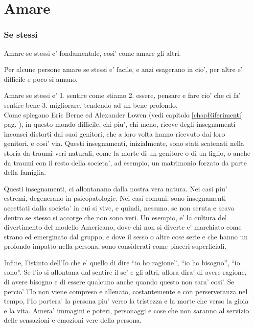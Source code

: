 \section{Amare}
\label{amareSe}


\subsubsection{Se stessi}
Amare se stessi e' fondamentale, cosi' come amare gli altri.

Per alcune persone amare se stessi e' facile, e anzi esagerano in cio', per altre e' difficile e poco si amano.

Amare se stessi e' 1. sentire come stiamo 2. essere, pensare e fare cio' che ci fa' sentire bene 3. migliorare, tendendo ad un bene profondo.\\

Come spiegano Eric Berne ed Alexander Lowen (vedi capitolo \ref{chapRiferimenti} pag. \pageref{chapRiferimenti}), in questo mondo difficile, chi piu', chi meno, riceve degli insegnamenti inconsci distorti dai suoi genitori, che a loro volta hanno ricevuto dai loro genitori, e cosi' via. Questi insegnamenti, inizialmente, sono stati scatenati nella storia da traumi veri naturali, come la morte di un genitore o di un figlio, o anche da traumi con il resto della societa', ad esempio, un matrimonio forzato da parte della famiglia.

Questi insegnamenti, ci allontanano dalla nostra vera natura. Nei casi piu' estremi, degenerano in psicopatologie. Nei casi comuni, sono insegnamenti accettati dalla societa' in cui si vive, e quindi, nessuno, se non scruta e scava dentro se stesso si accorge che non sono veri. Un esempio, e' la cultura del divertimento del modello Americano, dove chi non si diverte e' marchiato come strano ed emerginato dal gruppo, e dove il sesso o altre cose serie e che hanno un profondo impatto nella persona, sono considerati come piaceri superficiali.

Infine, l'istinto dell'Io che e' quello di dire ``io ho ragione'', ``io ho bisogno'', ``io sono''. Se l'io si allontana dal sentire il se' e gli altri, allora dira' di avere ragione, di avere bisogno e di essere qualcuno anche quando questo non sara' cosi'. Se percio' l'Io non viene compreso e allenato, costantemente e con perserveranza nel tempo, l'Io portera' la persona piu' verso la tristezza e la morte che verso la gioia e la vita. Amera' immagini e poteri, personaggi e cose che non saranno al servizio delle sensazioni e emozioni vere della persona.

